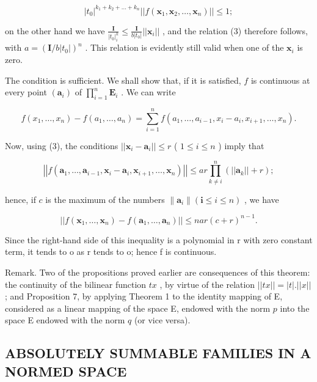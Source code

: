 \[
\left| t _ {0} \right| ^ {k _ {1} + k _ {2} + \dots + k _ {n}} \left| \left| f \left(\boldsymbol {x} _ {1}, \boldsymbol {x} _ {2}, \dots , \boldsymbol {x} _ {n}\right) \right| \right| \leqslant 1;
\]

on the other hand we have \(\frac{\mathbf{I}}{|t_0|^k_i} \leqslant \frac{\mathbf{I}}{b|t_0|} ||\boldsymbol{x}_i||\) , and the relation (3) therefore follows, with \(a = (\mathbf{I}/b|t_0|)^n\) . This relation is evidently still valid when one of the \(\boldsymbol{x}_i\) is zero.

The condition is sufficient. We shall show that, if it is satisfied, \(f\) is continuous at every point \((\pmb{a}_i)\) of \(\prod_{i=1}^{n} \mathbf{E}_i\) . We can write

\[
f \left(x _ {1}, \dots , x _ {n}\right) - f \left(a _ {1}, \dots , a _ {n}\right) = \sum_ {i = 1} ^ {n} f \left(a _ {1}, \dots , a _ {i - 1}, x _ {i} - a _ {i}, x _ {i + 1}, \dots , x _ {n}\right).
\]

Now, using (3), the conditions \(||\pmb{x}_i - \pmb{a}_i|| \leqslant r\) ( \(1 \leqslant i \leqslant n\) ) imply that

\[
\left| \left| f \left(\boldsymbol {a} _ {1}, \dots , \boldsymbol {a} _ {i - 1}, \boldsymbol {x} _ {i} - \boldsymbol {a} _ {i}, \boldsymbol {x} _ {i + 1}, \dots , \boldsymbol {x} _ {n}\right) \right| \right| \leqslant a r \prod_ {k \neq i} ^ {n} \left(\left| \left| \boldsymbol {a} _ {k} \right| \right| + r\right);
\]

hence, if \(c\) is the maximum of the numbers \(\| \pmb{a}_i \| (\mathbf{i} \leqslant i \leqslant n)\) , we have

\[
\left| \left| f \left(\boldsymbol {x} _ {1}, \dots , \boldsymbol {x} _ {n}\right) - f \left(\boldsymbol {a} _ {1}, \dots , \boldsymbol {a} _ {n}\right) \right| \right| \leqslant n a r (c + r) ^ {n - 1}.
\]

Since the right-hand side of this inequality is a polynomial in r with zero constant term, it tends to o as r tends to o; hence f is continuous.

Remark. Two of the propositions proved earlier are consequences of this theorem: the continuity of the bilinear function \(tx\) , by virtue of the relation \(||tx|| = |t|.||x||\) ; and Proposition 7, by applying Theorem 1 to the identity mapping of E, considered as a linear mapping of the space E, endowed with the norm \(p\) into the space E endowed with the norm \(q\) (or vice versa).

\subsection{ABSOLUTELY SUMMABLE FAMILIES IN A NORMED SPACE}

